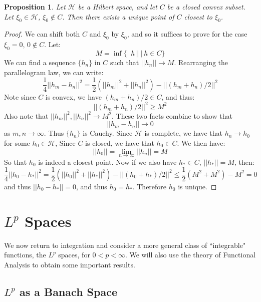 \documentclass[a4paper,12pt]{report}
\newcommand{\ms}[1]{\mathscr{#1}}
\newtheorem{prop}[theorem]{Proposition}
\begin{document}
	\begin{prop}
	Let $\ms{H}$ be a Hilbert space, and let $C$ be a closed convex subset. Let $\xi_0 \in \ms{H}$, $\xi_0 \notin C$. Then there exists a unique point of $C$ closest to $\xi_0$.
	\end{prop}
	\begin{proof}
	We can shift both $C$ and $\xi_0$ by $\xi_0$, and so it suffices to prove for the case $\xi_0 = 0$, $0 \notin C$. Let:
	\[ M = \inf \{ ||h|| ~|~ h \in C \} \]
	We can find a sequence $\{h_n\}$ in $C$ such that $||h_n|| \rightarrow M$. Rearranging the parallelogram law, we can write:
	\[ \frac{1}{4} ||h_m - h_n||^2 = \frac{1}{2}(||h_m||^2 + ||h_n||^2) - ||(h_m + h_n)/2||^2 \]
	Note since $C$ is convex, we have $(h_m + h_n)/2 \in C$, and thus:
	\[ ||(h_m + h_n)/2||^2 \geq M^2 \]
	Also note that $||h_m||^2, ||h_n||^2 \rightarrow M^2$. These two facts combine to show that 
	\[ ||h_m - h_n|| \rightarrow 0\]
	as $m, n \rightarrow \infty$. Thus $\{h_n\}$ is Cauchy. Since $\ms{H}$ is complete, we have that $h_n \rightarrow h_0$ for some $h_0 \in \ms{H}$, Since $C$ is closed, we have that $h_0 \in C$. We then have:
	\[ ||h_0|| = \lim_{n \rightarrow \infty} ||h_n|| = M \]
	So that $h_0$ is indeed a closest point. Now if we also have $h_* \in C$, $||h_*|| = M$, then:
	\[ \frac{1}{4} ||h_0 - h_*||^2 = \frac{1}{2}(||h_0||^2 + ||h_*||^2) - ||(h_0 + h_*)/2||^2 \leq \frac{1}{2}(M^2 + M^2) - M^2 = 0 \]
	and thus $||h_0 - h_*|| = 0$, and thus $h_0 = h_*$. Therefore $h_0$ is unique.
	
	\end{proof}
		
	
	\newpage
	\chapter{$L^p$ Spaces}
	We now return to integration and consider a more general class of ``integrable" functions, the $L^p$ spaces, for $0 < p < \infty$. We will also use the theory of Functional Analysis to obtain some important results. 
	
	\section{$L^p$ as a Banach Space}
	
\end{document}
